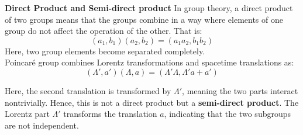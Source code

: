 \documentclass[14pt]{article} %
\begin{document}
\begin{tcolorbox}[proofbox, title=\textbf{Note:}]
\textbf{Direct Product and Semi-direct product}
\newline
In group theory, a direct product of two groups means that the groups combine in a way where elements of one group do not affect the operation of the other. That is:
\[
(a_1, b_1)(a_2, b_2) = (a_1 a_2, b_1 b_2)
\]
Here, two group elements become separated completely.\\
Poincaré group combines Lorentz transformations and spacetime translations as:
\[
(\Lambda', a')(\Lambda, a) = (\Lambda'\Lambda, \Lambda'a + a')
\]

Here, the second translation is transformed by $\Lambda'$, meaning the two parts interact nontrivially. Hence, this is not a direct product but a \textbf{semi-direct product}. The Lorentz part $\Lambda'$ transforms the translation $a$, indicating that the two subgroups are not independent.
\end{tcolorbox}
\vspace{-0.7cm}
\end{document}
